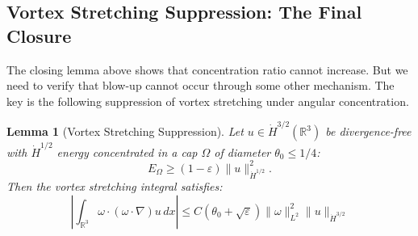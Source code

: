 \documentclass[11pt]{article}
\newtheorem{lemma}[theorem]{Lemma}
\theoremstyle{definition}
\begin{document}
\subsection{Vortex Stretching Suppression: The Final Closure}

The closing lemma above shows that concentration ratio cannot increase. But we need to verify that blow-up cannot occur through some other mechanism. The key is the following suppression of vortex stretching under angular concentration.

\begin{lemma}[Vortex Stretching Suppression]\label{lem:vortex-suppression}
Let $u \in \dot{H}^{3/2}(\mathbb{R}^3)$ be divergence-free with $\dot{H}^{1/2}$ energy concentrated in a cap $\Omega$ of diameter $\theta_0 \leq 1/4$:
\[
E_\Omega \geq (1-\varepsilon)\|u\|_{\dot{H}^{1/2}}^2.
\]
Then the vortex stretching integral satisfies:
\begin{equation}\label{eq:vortex-bound}
\boxed{\left|\int_{\mathbb{R}^3} \omega \cdot (\omega \cdot \nabla)u \, dx\right| \leq C(\theta_0 + \sqrt{\varepsilon})\|\omega\|_{L^2}^2 \|u\|_{\dot{H}^{3/2}}}
\end{equation}
\end{lemma}
\end{document}
